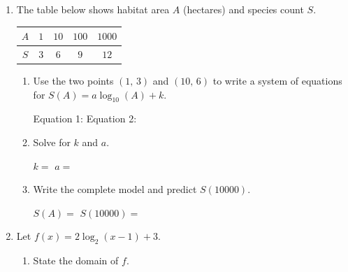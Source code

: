 \documentclass[10pt]{article}
\begin{document}
\begin{enumerate}[leftmargin=1.8em, itemsep=14pt]
\begin{enumerate}[leftmargin=1.5em, itemsep=8pt, label=\alph*.]
  \vspace{4pt}
  $a\ln(e^3) = 6 \;\Rightarrow\; a \cdot \blank{1.5cm} = 6 \;\Rightarrow\; a = $ \blank{2cm}

  \item Write the complete model.

  \vspace{4pt}
  $f(x) = $ \blank{4cm}

  \item Predict $f(e^5)$.

  \vspace{4pt}
  $f(e^5) = $ \blank{5cm}
\end{enumerate}

\item The table below shows habitat area $A$ (hectares) and species count $S$.

\vspace{6pt}
\begin{center}
\renewcommand{\arraystretch}{1.8}
\begin{tabular}{|c|c|c|c|c|}
\hline
\rowcolor{sky}
$A$ & $1$ & $10$ & $100$ & $1000$ \\
\hline
$S$ & $3$ & $6$  & $9$   & $12$ \\
\hline
\end{tabular}
\end{center}

\begin{enumerate}[leftmargin=1.5em, itemsep=8pt, label=\alph*.]
  \item Use the two points $(1,\,3)$ and $(10,\,6)$ to write a system of equations
        for $S(A) = a\log_{10}(A) + k$.

  \vspace{4pt}
  Equation 1: \blank{6cm} \quad Equation 2: \blank{6cm}

  \item Solve for $k$ and $a$.

  \vspace{4pt}
  $k = $ \blank{2cm} \qquad $a = $ \blank{2cm}

  \item Write the complete model and predict $S(10000)$.

  \vspace{4pt}
  $S(A) = $ \blank{4cm} \qquad $S(10000) = $ \blank{3cm}
\end{enumerate}

\item Let $f(x) = 2\log_2(x - 1) + 3$.

\begin{enumerate}[leftmargin=1.5em, itemsep=8pt, label=\alph*.]
  \item State the domain of $f$.


\end{enumerate}
\end{enumerate}
\end{document}
